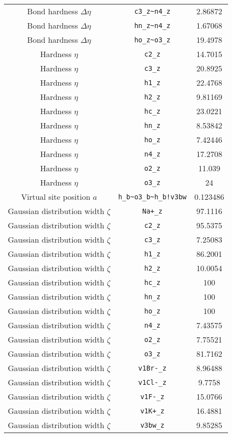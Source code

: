 \begin{table}[ht]
\begin{tabular}{|c|c|c|}
Bond hardness $\Delta\eta$ & \verb^c3_z~n4_z^ & 2.86872 \\ 
Bond hardness $\Delta\eta$ & \verb^hn_z~n4_z^ & 1.67068 \\ 
Bond hardness $\Delta\eta$ & \verb^ho_z~o3_z^ & 19.4978 \\ 
Hardness $\eta$ & \verb^c2_z^ & 14.7015 \\ 
Hardness $\eta$ & \verb^c3_z^ & 20.8925 \\ 
Hardness $\eta$ & \verb^h1_z^ & 22.4768 \\ 
Hardness $\eta$ & \verb^h2_z^ & 9.81169 \\ 
Hardness $\eta$ & \verb^hc_z^ & 23.0221 \\ 
Hardness $\eta$ & \verb^hn_z^ & 8.53842 \\ 
Hardness $\eta$ & \verb^ho_z^ & 7.42446 \\ 
Hardness $\eta$ & \verb^n4_z^ & 17.2708 \\ 
Hardness $\eta$ & \verb^o2_z^ & 11.039 \\ 
Hardness $\eta$ & \verb^o3_z^ & 24 \\ 
Virtual site position $a$ & \verb^h_b~o3_b~h_b!v3bw^ & 0.123486 \\ 
Gaussian distribution width $\zeta$ & \verb^Na+_z^ & 97.1116 \\ 
Gaussian distribution width $\zeta$ & \verb^c2_z^ & 95.5375 \\ 
Gaussian distribution width $\zeta$ & \verb^c3_z^ & 7.25083 \\ 
Gaussian distribution width $\zeta$ & \verb^h1_z^ & 86.2001 \\ 
Gaussian distribution width $\zeta$ & \verb^h2_z^ & 10.0054 \\ 
Gaussian distribution width $\zeta$ & \verb^hc_z^ & 100 \\ 
Gaussian distribution width $\zeta$ & \verb^hn_z^ & 100 \\ 
Gaussian distribution width $\zeta$ & \verb^ho_z^ & 100 \\ 
Gaussian distribution width $\zeta$ & \verb^n4_z^ & 7.43575 \\ 
Gaussian distribution width $\zeta$ & \verb^o2_z^ & 7.75521 \\ 
Gaussian distribution width $\zeta$ & \verb^o3_z^ & 81.7162 \\ 
Gaussian distribution width $\zeta$ & \verb^v1Br-_z^ & 8.96488 \\ 
Gaussian distribution width $\zeta$ & \verb^v1Cl-_z^ & 9.7758 \\ 
Gaussian distribution width $\zeta$ & \verb^v1F-_z^ & 15.0766 \\ 
Gaussian distribution width $\zeta$ & \verb^v1K+_z^ & 16.4881 \\ 
Gaussian distribution width $\zeta$ & \verb^v3bw_z^ & 9.85285 \\ 
\hline
\end{tabular}
\end{table}
